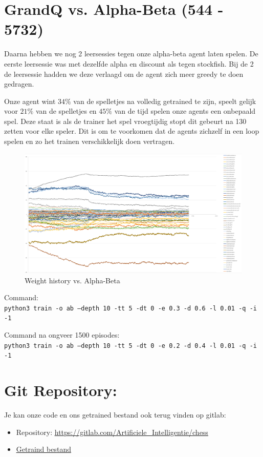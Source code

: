 \documentclass[a4paper,openany]{uantwerpenassignment}
\newcommand{\codeword}[1]{
    \colorbox{code}{\texttt{\textcolor{codetext}{#1}}}
}
\begin{document}
\section{GrandQ vs. Alpha-Beta (544 - 5732)}

Daarna hebben we nog 2 leersessies tegen onze alpha-beta agent laten spelen. De eerste leersessie was met dezelfde alpha en discount als tegen stockfish. Bij de 2 de leersessie hadden we deze verlaagd om de agent zich meer greedy te doen gedragen.

Onze agent wint $34\%$ van de spelletjes na volledig getrained te zijn, speelt gelijk voor $21\%$ van de spelletjes en $45\%$ van de tijd spelen onze agents een onbepaald spel. Deze staat is als de trainer het spel vroegtijdig stopt dit gebeurt na 130 zetten voor elke speler. Dit is om te voorkomen dat de agents zichzelf in een loop spelen en zo het trainen verschikkelijk doen vertragen.

\begin{figure}[h]
    \centering
    \includegraphics[width=\textwidth]{images/ab.png}
    \caption{Weight history vs. Alpha-Beta}
    \label{fig:ab}
\end {figure}

Command:\\
\codeword{python3 train -o ab --depth 10 -tt 5 -dt 0 -e 0.3 -d 0.6 -l 0.01 -q -i -1}

Command na ongveer 1500 episodes:\\
\codeword{python3 train -o ab --depth 10 -tt 5 -dt 0 -e 0.2 -d 0.4 -l 0.01 -q -i -1}

\section{Git Repository:}
Je kan onze code en ons getrained bestand ook terug vinden op gitlab: 
\begin{itemize}
    \item Repository: \href{https://gitlab.com/Artificiele_Intelligentie/chess}{\color{blue}\underline{https://gitlab.com/Artificiele\_Intelligentie/chess}}
    \item \href{https://gitlab.com/Artificiele_Intelligentie/chess/-/raw/master/grandQ.json}{\color{blue}\underline{Getraind bestand}}
\end{itemize}





\end{document}
